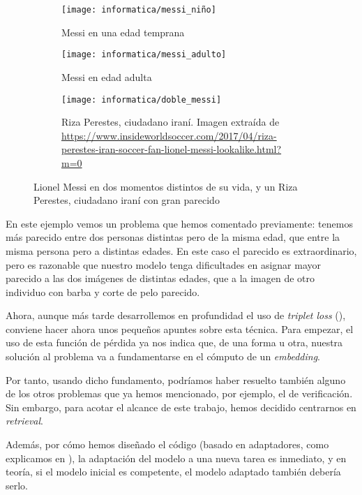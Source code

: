 \begin{figure}[H]
\centering
    \begin{subfigure}{0.5\textwidth}
        \centering
        \texttt{[image: informatica/messi\_niño]}
        \caption{Messi en una edad temprana}
    \end{subfigure}%
    \begin{subfigure}{.5\textwidth}
        \centering
        \texttt{[image: informatica/messi\_adulto]}
        \caption{Messi en edad adulta}
    \end{subfigure}

    \begin{subfigure}{.8\textwidth}
        \centering
        \texttt{[image: informatica/doble\_messi]}
        \caption{Riza Perestes, ciudadano iraní. Imagen extraída de \url{https://www.insideworldsoccer.com/2017/04/riza-perestes-iran-soccer-fan-lionel-messi-lookalike.html?m=0}}
    \end{subfigure}

\caption{Lionel Messi en dos momentos distintos de su vida, y un Riza Perestes, ciudadano iraní con gran parecido}
\label{img:messi_distintos_otro_adulto}
\end{figure}

En este ejemplo vemos un problema que hemos comentado previamente: tenemos más parecido entre dos personas distintas pero de la misma edad, que entre la misma persona pero a distintas edades. En este caso el parecido es extraordinario, pero es razonable que nuestro modelo tenga dificultades en asignar mayor parecido a las dos imágenes de distintas edades, que a la imagen de otro individuo con barba y corte de pelo parecido.

Ahora, aunque más tarde desarrollemos en profundidad el uso de \textit{triplet loss} (), conviene hacer ahora unos pequeños apuntes sobre esta técnica. Para empezar, el uso de esta función de pérdida ya nos indica que, de una forma u otra, nuestra solución al problema va a fundamentarse en el cómputo de un \textit{embedding}.

Por tanto, usando dicho fundamento, podríamos haber resuelto también alguno de los otros problemas que ya hemos mencionado, por ejemplo, el de verificación. Sin embargo, para acotar el alcance de este trabajo, hemos decidido centrarnos en \textit{retrieval}.

Además, por cómo hemos diseñado el código (basado en adaptadores, como explicamos en ), la adaptación del modelo a una nueva tarea es inmediato, y en teoría, si el modelo inicial es competente, el modelo adaptado también debería serlo.

